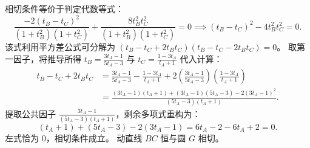 \begin{solution}
相切条件等价于判定代数等式：
\[ \frac{-2(t_B - t_C)^2}{(1+t_B^2)(1+t_C^2)} + \frac{8t_B^2 t_C^2}{(1+t_B^2)(1+t_C^2)} = 0 \implies (t_B - t_C)^2 - 4t_B^2 t_C^2 = 0. \]
该式利用平方差公式可分解为 $(t_B - t_C + 2t_B t_C)(t_B - t_C - 2t_B t_C) = 0$。
取第一因子，将推导所得 $t_B = \frac{3t_A - 1}{5t_A - 3}$ 与 $t_C = \frac{1 - 3t_A}{t_A + 1}$ 代入计算：
\begin{align*}
t_B - t_C + 2t_B t_C &= \frac{3t_A - 1}{5t_A - 3} - \frac{1 - 3t_A}{t_A + 1} + 2 \left( \frac{3t_A - 1}{5t_A - 3} \right) \left( \frac{1 - 3t_A}{t_A + 1} \right) \\
&= \frac{(3t_A - 1)(t_A + 1) + (3t_A - 1)(5t_A - 3) - 2(3t_A - 1)^2}{(5t_A - 3)(t_A + 1)}.
\end{align*}
提取公共因子 $\frac{3t_A - 1}{(5t_A - 3)(t_A + 1)}$，剩余多项式重构为：
\[ (t_A + 1) + (5t_A - 3) - 2(3t_A - 1) = 6t_A - 2 - 6t_A + 2 = 0. \]
左式恰为 $0$，相切条件成立。
动直线 $BC$ 恒与圆 $G$ 相切。
\end{solution}


